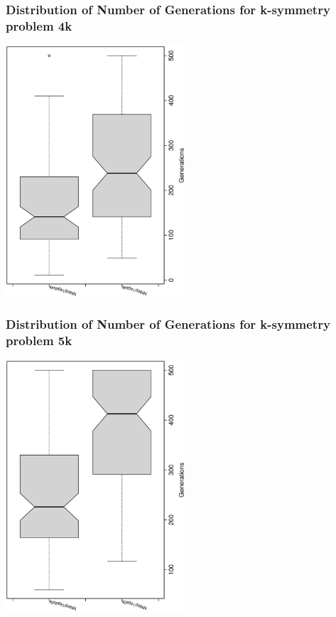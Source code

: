 \documentclass[18pt,c]{beamer}
\begin{document}
 \begin{frame}
 \frametitle{ Distribution of Number of Generations for k-symmetry problem 4k }
 \begin{center}
\includegraphics[width=0.5\textwidth, angle=-90]
{ExpDboxplottGenerations002.eps}
 \end{center}
 \label{ExpDboxplottGenerations002.eps}  
 \end{frame}

 \begin{frame}
 \frametitle{ Distribution of Number of Generations for k-symmetry problem 5k }
 \begin{center}
\includegraphics[width=0.5\textwidth, angle=-90]
{ExpDboxplottGenerations003.eps}
 \end{center}
 \label{ExpDboxplottGenerations003.eps}  
 \end{frame}
\end{document}
